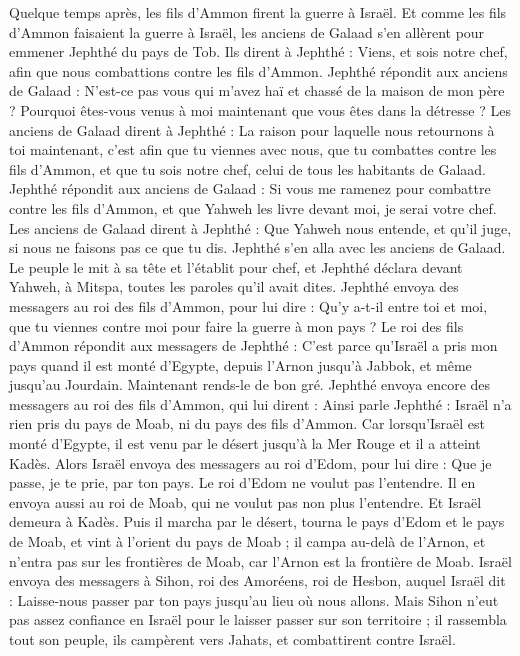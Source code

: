 \begin{multicols}{2}
Quelque temps après, les fils d'Ammon firent la guerre à Israël.
Et comme les fils d'Ammon faisaient la guerre à Israël, les anciens de Galaad s'en allèrent pour emmener Jephthé du pays de Tob.
Ils dirent à Jephthé : Viens, et sois notre chef, afin que nous combattions contre les fils d'Ammon.
Jephthé répondit aux anciens de Galaad : N'est-ce pas vous qui m'avez haï et chassé de la maison de mon père ? Pourquoi êtes-vous venus à moi maintenant que vous êtes dans la détresse ?
Les anciens de Galaad dirent à Jephthé : La raison pour laquelle nous retournons à toi maintenant, c'est afin que tu viennes avec nous, que tu combattes contre les fils d'Ammon, et que tu sois notre chef, celui de tous les habitants de Galaad.
Jephthé répondit aux anciens de Galaad : Si vous me ramenez pour combattre contre les fils d'Ammon, et que Yahweh les livre devant moi, je serai votre chef.
Les anciens de Galaad dirent à Jephthé : Que Yahweh nous entende, et qu'il juge, si nous ne faisons pas ce que tu dis.
Jephthé s'en alla avec les anciens de Galaad. Le peuple le mit à sa tête et l'établit pour chef, et Jephthé déclara devant Yahweh, à Mitspa, toutes les paroles qu'il avait dites.
Jephthé envoya des messagers au roi des fils d'Ammon, pour lui dire : Qu'y a-t-il entre toi et moi, que tu viennes contre moi pour faire la guerre à mon pays ?
Le roi des fils d'Ammon répondit aux messagers de Jephthé : C'est parce qu'Israël a pris mon pays quand il est monté d'Egypte, depuis l'Arnon jusqu'à Jabbok, et même jusqu'au Jourdain. Maintenant rends-le de bon gré.
Jephthé envoya encore des messagers au roi des fils d'Ammon,
qui lui dirent : Ainsi parle Jephthé : Israël n'a rien pris du pays de Moab, ni du pays des fils d'Ammon.
Car lorsqu’Israël est monté d'Egypte, il est venu par le désert jusqu'à la Mer Rouge et il a atteint Kadès.
Alors Israël envoya des messagers au roi d'Edom, pour lui dire : Que je passe, je te prie, par ton pays. Le roi d'Edom ne voulut pas l'entendre. Il en envoya aussi au roi de Moab, qui ne voulut pas non plus l'entendre. Et Israël demeura à Kadès.
Puis il marcha par le désert, tourna le pays d'Edom et le pays de Moab, et vint à l'orient du pays de Moab ; il campa au-delà de l'Arnon, et n'entra pas sur les frontières de Moab, car l'Arnon est la frontière de Moab.
Israël envoya des messagers à Sihon, roi des Amoréens, roi de Hesbon, auquel Israël dit : Laisse-nous passer par ton pays jusqu'au lieu où nous allons.
Mais Sihon n'eut pas assez confiance en Israël pour le laisser passer sur son territoire ; il rassembla tout son peuple, ils campèrent vers Jahats, et combattirent contre Israël.

\end{multicols}
